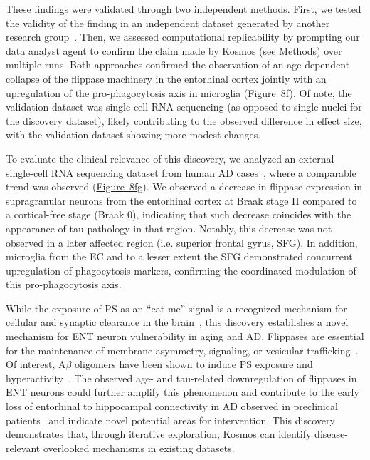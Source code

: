 \documentclass{article}
\begin{document}
These findings were validated through two independent methods. First, we tested the validity of the finding in an independent dataset generated by another research group~\cite{jin_brain-wide_2025}. Then, we assessed computational replicability by prompting our data analyst agent to confirm the claim made by Kosmos (see Methods) over multiple runs. Both approaches confirmed the observation of an age-dependent collapse of the flippase machinery in the entorhinal cortex jointly with an upregulation of the pro-phagocytosis axis in microglia (\hyperref[fig:fig8]{Figure~8f}). Of note, the validation dataset was single-cell RNA sequencing (as opposed to single-nuclei for the discovery dataset), likely contributing to the observed difference in effect size, with the validation dataset showing more modest changes.

To evaluate the clinical relevance of this discovery, we analyzed an external single-cell RNA sequencing dataset from human AD cases~\cite{leng_molecular_2021}, where a comparable trend was observed (\hyperref[fig:fig8]{Figure~8fg}). We observed a decrease in flippase expression in supragranular neurons from the entorhinal cortex at Braak stage II compared to a cortical-free stage (Braak 0), indicating that such decrease coincides with the appearance of tau pathology in that region. Notably, this decrease was not observed in a later affected region (i.e. superior frontal gyrus, SFG). In addition, microglia from the EC and to a lesser extent the SFG demonstrated concurrent upregulation of phagocytosis markers, confirming the coordinated modulation of this pro-phagocytosis axis. 

While the exposure of PS as an ``eat-me'' signal is a recognized mechanism for cellular and synaptic clearance in the brain~\cite{scotthewitt_local_2020, ruedacarrasco_microgliasynapse_2023}, this discovery establishes a novel mechanism for ENT neuron vulnerability in aging and AD. Flippases are essential for the maintenance of membrane asymmetry, signaling, or vesicular trafficking~\cite{sakuragi_regulation_2023}. Of interest, A$\beta$ oligomers have been shown to induce PS exposure and hyperactivity~\cite{ruedacarrasco_microgliasynapse_2023}. The observed age- and tau-related downregulation of flippases in ENT neurons could further amplify this phenomenon and contribute to the early loss of entorhinal to hippocampal connectivity in AD observed in preclinical patients~\cite{stoub_hippocampal_2006} and indicate novel potential areas for intervention. This discovery demonstrates that, through iterative exploration, Kosmos can identify disease-relevant overlooked mechanisms in existing datasets.
\end{document}
